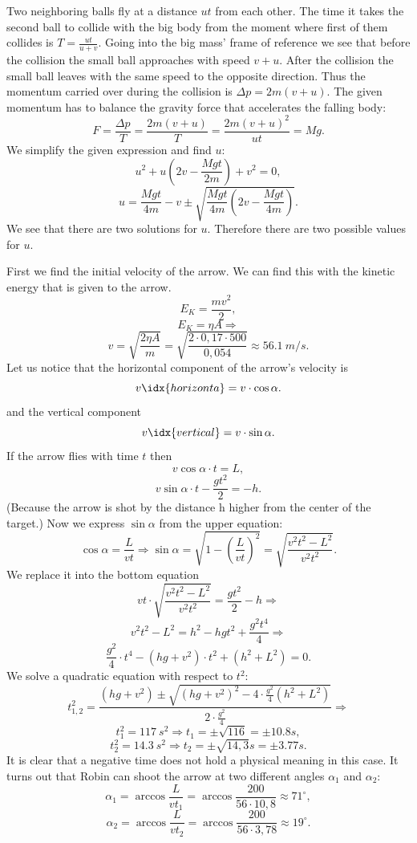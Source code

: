 \documentclass[11pt]{article}
\begin{document}
\solueng
Two neighboring balls fly at a distance $u t$ from each other. The time it takes the second ball to collide with the big body from the moment where first of them collides is $T=\frac{u t}{u+v}$. Going into the big mass’ frame of reference we see that before the collision the small ball approaches with speed $v + u$. After the collision the small ball leaves with the same speed to the opposite direction. Thus the momentum carried over during the collision is $\Delta p = 2m(v + u)$. The given momentum has to balance the gravity force that accelerates the falling body:
\[ F=\frac{\Delta p}{T}=\frac{2m(v + u)}{T} = \frac{2m(v + u)^2}{ut}=Mg. \] 
We simplify the given expression and find $u$:
\[
u^2 + u\left( 2v - \frac{Mgt}{2m}\right) + v^2 = 0,
\] 
\[
u = \frac{Mgt}{4m} - v \pm \sqrt{\frac{Mgt}{4m}\left( 2v - \frac{Mgt}{4m}\right)}.
\]
We see that there are two solutions for $u$. Therefore there are two possible values for $u$.
\probend
\bigskip


\solueng
First we find the initial velocity of the arrow. We can find this with the kinetic energy that is given to the arrow.
$$ E_{K}=\frac{m v^2}{2},$$ 
$$E_{K}=\eta A \Rightarrow$$
$$v=\sqrt{\frac{2\eta A}{m}}=\sqrt{\frac{2\cdot0,17\cdot 500}{0,054}}\approx \SI{56,1}{m/s}.$$
Let us notice that the horizontal component of the arrow’s velocity is 
$$v\idx{horizonta}=v\cdot \cos\alpha.$$ 
and the vertical component
$$v\idx{vertical}=v\cdot \sin\alpha.$$ 
If the arrow flies with time $t$ then 
$$v \cos\alpha\cdot t=L,$$ 
$$v \sin\alpha\cdot t-\frac{g t^2}{2}=-h. $$
(Because the arrow is shot by the distance h higher from the center of the target.) 
Now we express $\sin\alpha$ from the upper equation:
$$\cos\alpha=\frac{L}{vt} \Rightarrow \sin\alpha=\sqrt{1-\left(\frac{L}{vt}\right)^2}=\sqrt{\frac{v^2t^2-L^2}{v^2t^2}}.$$ 
We replace it into the bottom equation
$$vt\cdot \sqrt{\frac{v^2t^2-L^2}{v^2t^2}}=\frac{g t^2}{2}-h \Rightarrow$$ 
$$v^2t^2-L^2=h^2 - hgt^2+\frac{g^2 t^4}{4}  \Rightarrow$$
$$\frac{g^2}{4}\cdot t^4 - \left(hg+v^2\right)\cdot t^2 + \left(h^2+L^2\right)=0.$$
We solve a quadratic equation with respect to $t^2$:
$$t^2_{1,2}=\frac{\left(hg+v^2\right)\pm\sqrt{\left(hg+v^2\right)^2-4\cdot \frac{g^2}{4}\left(h^2+L^2\right)}}{2\cdot \frac{g^2}{4}} \Rightarrow$$ 
$$t^2_{1}=\SI{117}{s^2}  \Rightarrow t_{1}=\pm\sqrt{116}=\pm \SI{10,8}s,$$
$$t^2_{2}=\SI{14,3}{s^2} \Rightarrow t_{2}=\pm \sqrt{14,3}\SI{}s=\pm \SI{3,77}s.$$
It is clear that a negative time does not hold a physical meaning in this case. It turns out that Robin can shoot the arrow at two different angles $\alpha_{1}$ and $\alpha_{2}$:
$$\alpha_{1}= \arccos\frac{L}{vt_{1}}=\arccos\frac{200}{56\cdot10,8}\approx 71^\circ ,$$ 
$$\alpha_{2}=\arccos\frac{L}{vt_{2}}=\arccos\frac{200}{56\cdot3,78}\approx 19^\circ .$$
\probend
\bigskip
\end{document}
